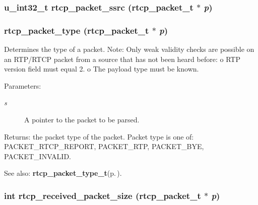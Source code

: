 \subsubsection{\setlength{\rightskip}{0pt plus 5cm}u\_\-int32\_\-t rtcp\_\-packet\_\-ssrc ({\bf rtcp\_\-packet\_\-t} $\ast$ {\em p})\hspace{0.3cm}{\tt  [static]}}\label{rtcp_8h_a25}


\subsubsection{ rtcp\_\-packet\_\-type ({\bf rtcp\_\-packet\_\-t} $\ast$ {\em p})\hspace{0.3cm}{\tt  [static]}}\label{rtcp_8h_a24}


Determines the type of a packet. Note: Only weak validity checks are possible on an RTP/RTCP packet from a source that has not been heard before: o RTP version field must equal 2. o The payload type must be known. \begin{Desc}
\item[Parameters:]
\begin{description}
\item[{\em s}]A pointer to the packet to be parsed. \end{description}
\end{Desc}
\begin{Desc}
\item[Returns:]the packet type of the packet. Packet type is one of: PACKET\_\-RTCP\_\-REPORT, PACKET\_\-RTP, PACKET\_\-BYE, PACKET\_\-INVALID. \end{Desc}
\begin{Desc}
\item[See also:]{\bf rtcp\_\-packet\_\-type\_\-t}{\rm (p.\,\pageref{rtp_8h_a35})}. \end{Desc}
\subsubsection{\setlength{\rightskip}{0pt plus 5cm}int rtcp\_\-received\_\-packet\_\-size ({\bf rtcp\_\-packet\_\-t} $\ast$ {\em p})\hspace{0.3cm}{\tt  [static]}}\label{rtcp_8h_a21}


